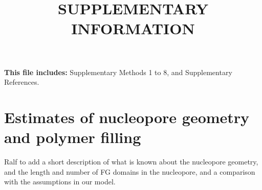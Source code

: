 \documentclass[10pt, a4paper]{article}
\title{SUPPLEMENTARY INFORMATION}
\author{}
\date{}
\begin{document}
\maketitle

\textbf{This file includes:} Supplementary Methods 1 to 8, and Supplementary References.

\pagebreak
\section{Estimates of nucleopore geometry and polymer filling}
\begin{multicols}{2}

Ralf to add a short description of what is known about the nucleopore geometry, and the length and number of FG domains in the nucleopore, and a comparison with the assumptions in our model. 

\end{multicols}




\end{document}
